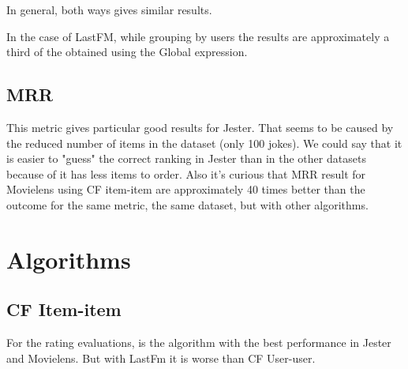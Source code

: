 \documentclass[a4paper]{article}
\begin{document}
In general, both ways gives similar results.

In the case of LastFM, while grouping by users the results are approximately a third of the obtained using the Global expression.


\subsection{MRR}

This metric gives particular good results for Jester. That seems to be caused by the reduced number of items in the dataset (only 100 jokes). We could say that it is easier to "guess" the correct ranking in Jester than in the other datasets because of it has less items to order.
Also it's curious that MRR result for Movielens using CF item-item are approximately 40 times better than the outcome for the same metric, the same dataset, but with other algorithms.



\section{Algorithms}
\subsection{CF Item-item}
For the rating evaluations, is the algorithm with the best performance in Jester and Movielens. But with LastFm it is worse than CF User-user.


\end{document}
